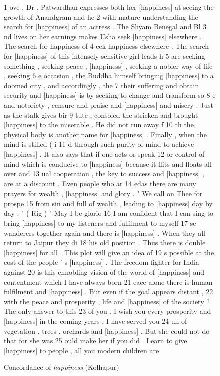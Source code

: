 \begin{figure}
\caption{Concordance of \textit{happiness} (Kolhapur)}
\label{fig:happinesskolhapur}
\hrulefill
\begin{fitverb}
 1 ove . Dr . Patwardhan expresses both her [happiness] at seeing the growth of Anandgram and he
 2 with mature understanding the search for [happiness] of an actress . The Shyam Benegal and Bl
 3 nd lives on her earnings makes Usha seek [happiness] elsewhere . The search for happiness of
 4 eek happiness elsewhere . The search for [happiness] of this intensely sensitive girl leads h
 5  are seeking something , seeking peace , [happiness] , seeking a nobler way of life , seeking
 6 e occasion , the Buddha himself bringing [happiness] to a doomed city , and accordingly , the
 7  their suffering and obtain security and [happiness] is by seeking to change and transform so
 8 e and notoriety , censure and praise and [happiness] and misery . Just as the stalk gives bir
 9 tute , consoled the stricken and brought [happiness] to the miserable . He did not run away f
10 th the physical body is another name for [happiness] . Finally , when the mind is stilled ( i
11 d through such purity of mind to achieve [happiness] . It also says that if one acts or speak
12 or control of mind which is conducive to [happiness] because it flits and floats all over and
13 ual cooperation , the key to success and [happiness] , are at a discount . Even people who ar
14 edas there are many prayers for wealth , [happiness] and glory . " We call on Thee for prospe
15 from sin and full of wealth , leading to [happiness] day by day . " ( Rig ) " May I be glorio
16  I am confident that I can sing to bring [happiness] to my listeners and fulfilment to myself
17 se wanderers together again and there is [happiness] . When they all return to Jaipur they di
18  his old position . Thus there is double [happiness] for all . This plot will give an idea of
19 s possible at the cost of the people ' s [happiness] . The freedom fighter for India against
20 is this ennobling vision of the world of [happiness] and contentment which I have always born
21 eace alone there is human fulfilment and [happiness] . But even if the goal appears distant ,
22 with the peace and prosperity , life and [happiness] of the society ? The only answer to this
23 of you . I wish you every prosperity and [happiness] in the coming years . I have served you
24 ull of vegetation , trees , orchards and [happiness] . But she could not do that for she was
25 ould make her if you did . Learn to give [happiness] to people , all you modern children are

\end{fitverb}
\end{figure}
